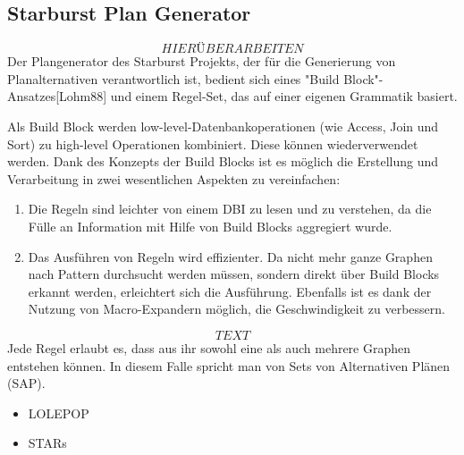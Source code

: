 \subsection{Starburst Plan Generator}
$$HIER ÜBERARBEITEN$$
Der Plangenerator des Starburst Projekts, der für die Generierung von Planalternativen verantwortlich ist, bedient sich eines "Build Block"-Ansatzes[Lohm88] und einem Regel-Set, das auf einer eigenen Grammatik basiert.  

Als Build Block werden low-level-Datenbankoperationen (wie Access, Join und Sort) zu high-level Operationen kombiniert. Diese können wiederverwendet werden. Dank des Konzepts der Build Blocks ist es möglich die Erstellung und Verarbeitung in zwei wesentlichen Aspekten zu vereinfachen:


\begin{enumerate}


\item Die Regeln sind leichter von einem DBI zu lesen und zu verstehen, da die Fülle an Information mit Hilfe von Build Blocks aggregiert wurde.

\item Das Ausführen von Regeln wird effizienter. Da nicht mehr ganze Graphen nach Pattern durchsucht werden müssen, sondern direkt über Build Blocks erkannt werden, erleichtert sich die Ausführung. Ebenfalls ist es dank der Nutzung von Macro-Expandern möglich, die Geschwindigkeit zu verbessern.


\end{enumerate}


$$TEXT$$
Jede Regel erlaubt es, dass aus ihr sowohl eine als auch mehrere Graphen entstehen können. In diesem Falle spricht man von Sets von Alternativen Plänen (SAP). 


\begin{itemize}
\item LOLEPOP
\item STARs
\end{itemize}

 